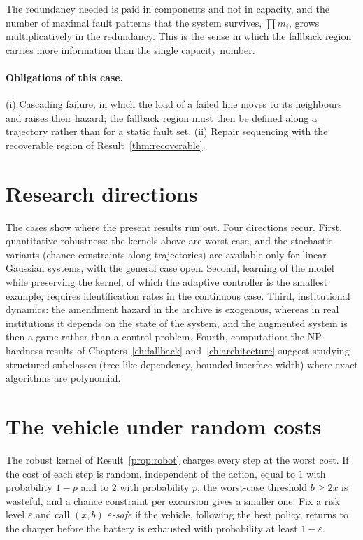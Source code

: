 The redundancy needed is paid in components and not in capacity, and the number of maximal fault patterns that the system survives, $\prod m_i$, grows multiplicatively in the redundancy. This is the sense in which the fallback region carries more information than the single capacity number.

\paragraph{Obligations of this case.} (i) Cascading failure, in which the load of a failed line moves to its neighbours and raises their hazard; the fallback region must then be defined along a trajectory rather than for a static fault set. (ii) Repair sequencing with the recoverable region of Result~\ref{thm:recoverable}.

\section{Research directions}

The cases show where the present results run out. Four directions recur. First, quantitative robustness: the kernels above are worst-case, and the stochastic variants (chance constraints along trajectories) are available only for linear Gaussian systems, with the general case open. Second, learning of the model while preserving the kernel, of which the adaptive controller is the smallest example, requires identification rates in the continuous case. Third, institutional dynamics: the amendment hazard in the archive is exogenous, whereas in real institutions it depends on the state of the system, and the augmented system is then a game rather than a control problem. Fourth, computation: the NP-hardness results of Chapters~\ref{ch:fallback} and~\ref{ch:architecture} suggest studying structured subclasses (tree-like dependency, bounded interface width) where exact algorithms are polynomial.


\section{The vehicle under random costs}\label{sec:vehicle-chance}

The robust kernel of Result~\ref{prop:robot} charges every step at the worst cost. If the cost of each step is random, independent of the action, equal to $1$ with probability $1-p$ and to $2$ with probability $p$, the worst-case threshold $b\ge2x$ is wasteful, and a chance constraint per excursion gives a smaller one. Fix a risk level $\varepsilon$ and call $(x,b)$ \emph{$\varepsilon$-safe} if the vehicle, following the best policy, returns to the charger before the battery is exhausted with probability at least $1-\varepsilon$.

